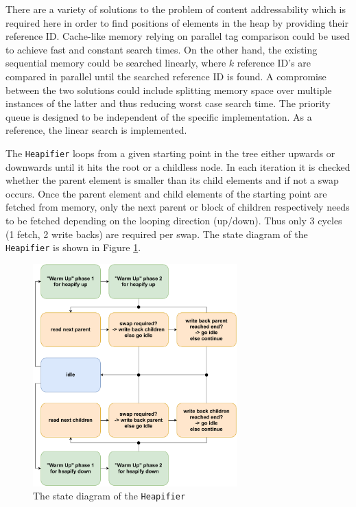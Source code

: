 \documentclass[runningheads]{llncs}
\begin{document}
There are a variety of solutions to the problem of content addressability which is required here in order to find positions of elements in the heap by providing
their reference ID. Cache-like memory relying on parallel tag comparison could be used to achieve fast and constant search times. On the other hand, the 
existing sequential memory could be searched linearly, where $k$ reference ID's are compared in parallel until the searched reference ID is found.
A compromise between the two solutions could include splitting memory space over multiple instances of the latter and thus reducing worst case search time.
The priority queue is designed to be independent of the specific implementation. As a reference, the linear search is implemented.

The \texttt{Heapifier} loops from a given starting point in the tree either upwards or downwards until it hits the root or a childless node. In each iteration 
it is checked whether the parent element is smaller than its child elements and if not a swap occurs. Once the parent element and child elements of the starting 
point are fetched from memory, only the next parent or block of children respectively needs to be fetched depending on the looping direction (up/down). Thus 
only 3 cycles (1 fetch, 2 write backs) are required per swap. The state diagram of the \texttt{Heapifier} is shown in Figure \ref{fig:pq_heapifier_state}.

\begin{figure}
	\centering
	\includegraphics[width=0.7\textwidth]{HeapifierStateDiagram.pdf}
	\caption{The state diagram of the \texttt{Heapifier}}
	\label{fig:pq_heapifier_state}
\end{figure}
\end{document}
